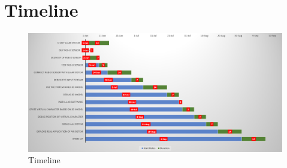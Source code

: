 \documentclass[a4paper,11pt]{article}
\begin{document}
\section{Timeline}
\begin{figure}[!htp]
\centering
\includegraphics[height=1.1\linewidth,width=1.5\linewidth,angle=-90]{20.png}
\caption{\label{fig:frog}Timeline}
\end{figure}
\end{document}
